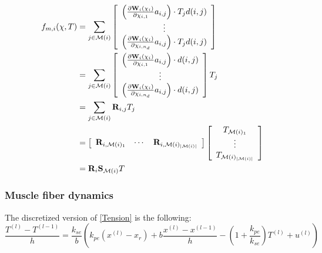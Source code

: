 \documentclass[a4paper,10pt]{article}
\begin{document}
\begin{align}
f_{m,i}(\chi ,T)
      & = \sum_{j \in \mathcal{M}(i)}\left [
\begin{array}{c}
\left( \frac{\partial\mathbf{W}_i(\chi_{i})}{\partial\chi_{i,1}} a_{i,j} \right) \cdot T_j d(i,j)\\
\vdots\\
\left( \frac{\partial\mathbf{W}_i(\chi_{i})}{\partial\chi_{i,n_d}} a_{i,j} \right) \cdot T_j d(i,j)
\end{array}
\right ]\notag\\
      & = \sum_{j \in \mathcal{M}(i)}\left [
\begin{array}{c}
\left( \frac{\partial\mathbf{W}_i(\chi_{i})}{\partial\chi_{i,1}} a_{i,j} \right) \cdot d(i,j) \\
\vdots\\
\left( \frac{\partial\mathbf{W}_i(\chi_{i})}{\partial\chi_{i,n_d}} a_{i,j} \right) \cdot d(i,j)
\end{array}
\right ]
T_j\notag\\
       & = \sum_{j \in \mathcal{M}(i)} \mathbf{R}_{i,j}
T_j\notag\\
       & =
\left [
\begin{array}{ccc}
\mathbf{R}_{i,\mathcal{M}(i)_1} &  \cdots  &  \mathbf{R}_{i,\mathcal{M}(i)_{|\mathcal{M}(i)|}}
\end{array}
\right ]
\left [
\begin{array}{c}
T_{\mathcal{M}(i)_1}\\
\vdots \\
T_{\mathcal{M}(i)_{|\mathcal{M}(i)|}}
\end{array}
\right ]\\
       & =
\mathbf{R}_i \mathbf{S}_{\mathcal{M}(i)} T
\end{align}

\subsubsection{Muscle fiber dynamics}
The discretized version of \eqref{Tension} is the following:
\begin{equation}
\frac{T^{(l)}-T^{(l-1)}}{h}
           = \frac{k_{se}}{b} \left( k_{pe}(x^{(l)}-x_{r})+b\frac{x^{(l)}-x^{(l-1)}}{h}-\left(1+\frac{k_{pe}}{k_{se}}\right) T^{(l)} + u^{(l)}   \right)
\end{equation}
\end{document}
